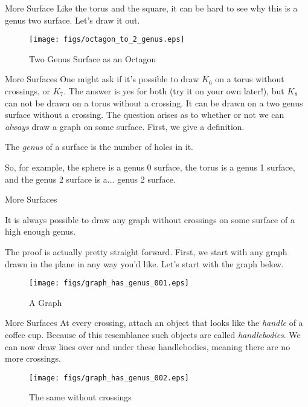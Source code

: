 \documentclass{beamer}
\begin{document}
    \begin{frame}{More Surface}
        Like the torus and the square, it can be hard to see why this is
        a genus two surface. Let's draw it out.
        \begin{figure}
            \centering
            \texttt{[image: figs/octagon\_to\_2\_genus.eps]}
            \caption{Two Genus Surface as an Octagon}
            \label{fig:two_genus_surface_octagon}
        \end{figure}
    \end{frame}
    \begin{frame}{More Surfaces}
        One might ask if it's possible to draw $K_{6}$ on a torus without
        crossings, or $K_{7}$. The answer is yes for both (try it on your own later!),
        but $K_{8}$ can not be drawn on a torus without a crossing. It can be drawn on a
        two genus surface without a crossing. The question arises as to whether or not we
        can \textit{always} draw a graph on some surface. First, we give a definition.
        \begin{definition}
            The \textit{genus} of a surface is the number of holes in it.
        \end{definition}
        So, for example, the sphere is a genus 0 surface, the torus is a genus 1 surface, and
        the genus 2 surface is a... genus 2 surface.
    \end{frame}
    \begin{frame}{More Surfaces}
        \begin{theorem}
            It is always possible to draw any graph without crossings
            on some surface of a high enough genus.
        \end{theorem}
        The proof is actually pretty straight forward. First, we start with any graph
        drawn in the plane in any way you'd like. Let's start with the graph below.
        \begin{figure}
            \centering
            \texttt{[image: figs/graph\_has\_genus\_001.eps]}
            \caption{A Graph}
            \label{fig:graph_has_genus_001}
        \end{figure}
    \end{frame}
    \begin{frame}{More Surfaces}
        At every crossing, attach an object that looks like the \textit{handle} of
        a coffee cup. Because of this resemblance such objects are called
        \textit{handlebodies}. We can now draw lines over and under these handlebodies,
        meaning there are no more crossings.
        \begin{figure}
            \centering
            \texttt{[image: figs/graph\_has\_genus\_002.eps]}
            \caption{The same without crossings}
            \label{fig:graph_has_genus_002}
        \end{figure}
    \end{frame}
\end{document}
